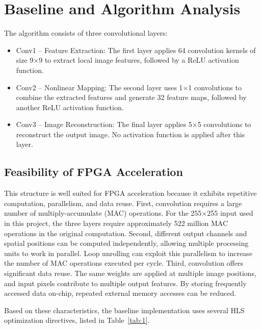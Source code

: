 \section{Baseline and Algorithm Analysis}\label{sec:2}

The algorithm consists of three convolutional layers:

\begin{itemize}
\item Conv1 -- Feature Extraction: The first layer applies 64 convolution kernels of size 9$\times$9 to extract local image features, followed by a ReLU activation function.
\item Conv2 -- Nonlinear Mapping: The second layer uses 1$\times$1 convolutions to combine the extracted features and generate 32 feature maps, followed by another ReLU activation function.
\item Conv3 -- Image Reconstruction: The final layer applies 5$\times$5 convolutions to reconstruct the output image. No activation function is applied after this layer.
\end{itemize}

\subsection{Feasibility of FPGA Acceleration}\label{sec:2.1}

This structure is well suited for FPGA acceleration because it exhibits repetitive computation, parallelism, and data reuse. First, convolution requires a large number of multiply-accumulate (MAC) operations. For the 255$\times$255 input used in this project, the three layers require approximately 522 million MAC operations in the original computation. Second, different output channels and spatial positions can be computed independently, allowing multiple processing units to work in parallel. Loop unrolling can exploit this parallelism to increase the number of MAC operations executed per cycle. Third, convolution offers significant data reuse. The same weights are applied at multiple image positions, and input pixels contribute to multiple output features. By storing frequently accessed data on-chip, repeated external memory accesses can be reduced.

Based on these characteristics, the baseline implementation uses several HLS optimization directives, listed in Table~\ref{tab:1}.

